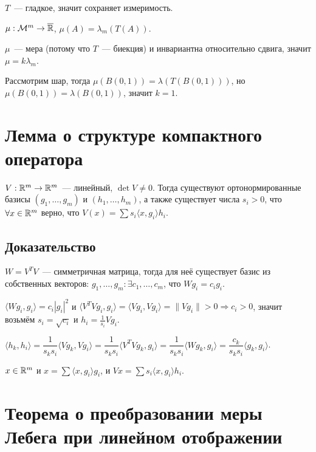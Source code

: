 \documentclass{article}
\begin{document}
            $T$~--- гладкое, значит сохраняет измеримость.
            
            $\mu : \mathcal{M}^m \rightarrow \overline{\mathbb{R}}$, $\mu(A) = \lambda_m(T(A))$.
            
            $\mu$~--- мера (потому что $T$~--- биекция) и инвариантна относительно сдвига, значит $\mu = k \lambda_m$.
            
            Рассмотрим шар, тогда $\mu(B(0, 1)) = \lambda (T (B(0, 1)))$, но $\mu (B(0, 1)) = \lambda(B(0, 1))$, значит $k = 1$.
            
    \newpage
    
    \section{Лемма о структуре компактного оператора}
    
        $V : \mathbb{R}^m \rightarrow \mathbb{R}^m$~--- линейный, $\det V \neq 0$. Тогда существуют ортонормированные базисы $(g_1, \ldots, g_m)$ и $(h_1, \ldots, h_m)$, а также существует числа $s_i > 0$, что $\forall x \in \mathbb{R}^m$ верно, что $V(x) = \sum s_i \langle x, g_i \rangle h_i$.
        
        \subsection{Доказательство}
        
            $W = V^T V$~--- симметричная матрица, тогда для неё существует базис из собственных векторов: $g_1, \ldots, g_m : \exists c_1, \ldots, c_m$, что $Wg_i = c_i g_i$.
            
            $\langle W g_i, g_i \rangle = c_i | g_i |^2$ и $\langle V^T V g_i, g_i \rangle = \langle V g_i, V g_i \rangle = \| V g_i \| > 0 \Rightarrow c_i > 0$, значит возьмём $s_i = \sqrt{c_i}$ и $h_i = \frac{1}{s_i} Vg_i$.
            
            $\langle h_k, h_i \rangle = \dfrac{1}{s_k s_i} \langle V g_k, V g_i \rangle = \dfrac{1}{s_k s_i} \langle V^T V g_k, g_i \rangle = \dfrac{1}{s_k s_i} \langle Wg_k, g_i \rangle = \dfrac{c_k}{s_k s_i} \langle g_k, g_i \rangle$.
            
            $x \in \mathbb{R}^m$ и $x = \sum \langle x, g_i \rangle g_i$, и $Vx = \sum s_i \langle x, g_i \rangle h_i$.
            
    \newpage
    
    \section{Теорема о преобразовании меры Лебега при линейном отображении}
    
\end{document}
